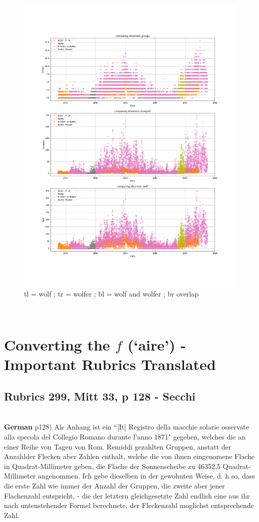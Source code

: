 \documentclass[12pt]{article}
\begin{document}
\begin{figure}[H]
    \includegraphics[width=0.5\linewidth]{wolf_and_wolfer_overlap.png}
    \caption{tl = wolf ; tr = wolfer ; bl = wolf and wolfer ; br overlap}
    \label{fig:wolf and wolfer initial plots}
\end{figure}\\


\newpage

\section{Converting the $f$ (`aire') - Important Rubrics Translated}\label{converting the `aire'}

\subsection{Rubrics 299, Mitt 33, p 128 - Secchi}\label{rubrics 299, secchi}\\

\textbf{German}
p128) Als Anhang ist ein ``[It] Registro della macchie solarie osservate alla specola del Collegio Romano durante l'anno 1871" gegeben, welches die an einer Reihe von Tagen von Rom. Remiddi gezahlten Gruppen, anstatt der Anzahlder Flecken aber Zahlen enthalt, welche die von ihnen eingenomene Flache in Quadrat-Millimeter geben, die Flache der Sonnenscheibe zu 46352,5 Quadrat-Millimeter angenommen. Ich gebe dieselben in der gewohnten Weise, d. h so, dass die erste Zahl wie immer der Anzahl der Gruppen, die zweite aber jener Flachenzahl entspricht, - die der letztern gleichgesetzte Zahl endlish eine aus ihr nach untenstehender Formel berechnete, der Fleckenzahl moglichst entsprechende Zahl.\\
\end{document}
